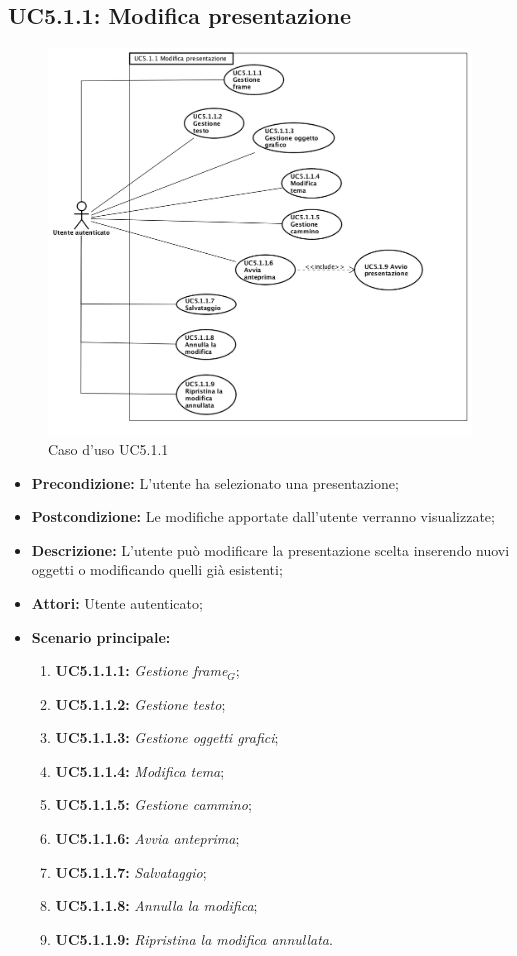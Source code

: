 \subsection{ UC5.1.1: Modifica presentazione}

\begin{figure}[h]
	\begin{center}
	\includegraphics[scale=0.4]{diagram/UC5-1-1.png}
	\caption{Caso d'uso UC5.1.1}
	\end{center}
\end{figure}
\begin{itemize}
	\item \textbf{Precondizione:} L'utente ha selezionato una presentazione;
	\item \textbf{Postcondizione:} Le modifiche apportate dall'utente verranno visualizzate;
	\item \textbf{Descrizione:} L'utente può modificare la presentazione scelta inserendo nuovi oggetti o modificando quelli già esistenti;
	\item \textbf{Attori:} Utente autenticato;
	\item \textbf{Scenario principale:}
	\begin{enumerate}
		\item \textbf{ UC5.1.1.1:} \textit{ Gestione frame$_G$};
		\item \textbf{ UC5.1.1.2:} \textit{ Gestione testo};
		\item \textbf{ UC5.1.1.3:} \textit{ Gestione oggetti grafici};
		\item \textbf{ UC5.1.1.4:} \textit{ Modifica tema};
		\item \textbf{ UC5.1.1.5:} \textit{ Gestione cammino};
		\item \textbf{ UC5.1.1.6:} \textit{ Avvia anteprima};
		\item \textbf{ UC5.1.1.7:} \textit{ Salvataggio};
		\item \textbf{ UC5.1.1.8:} \textit{ Annulla la modifica};
		\item \textbf{ UC5.1.1.9:} \textit{ Ripristina la modifica annullata}.
	\end{enumerate}
\end{itemize}
